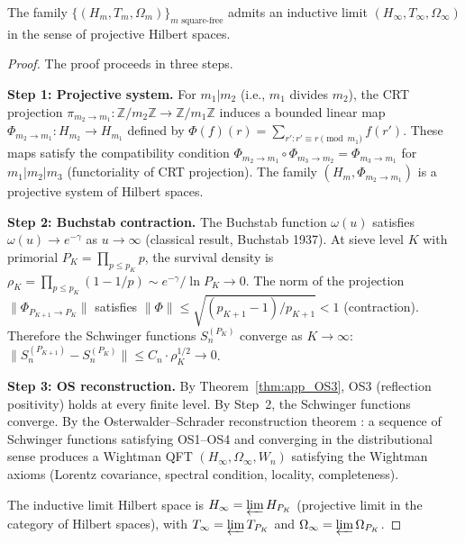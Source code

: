 \documentclass[12pt,a4paper]{article}
\begin{document}
\begin{theorem}
\label{thm:app_inductive}
The family $\{(H_m, T_m, \Omega_m)\}_{m \text{ square-free}}$ admits
an inductive limit $(H_\infty, T_\infty, \Omega_\infty)$ in the
sense of projective Hilbert spaces.

\begin{proof}
The proof proceeds in three steps.

\textbf{Step 1: Projective system.}
For $m_1 | m_2$ (i.e., $m_1$ divides $m_2$), the CRT projection
$\pi_{m_2 \to m_1} : \mathbb{Z}/m_2\mathbb{Z} \to
\mathbb{Z}/m_1\mathbb{Z}$ induces a bounded linear map
$\Phi_{m_2 \to m_1} : H_{m_2} \to H_{m_1}$ defined by
$\Phi(f)(r) = \sum_{r' : r' \equiv r \pmod{m_1}} f(r')$.
These maps satisfy the compatibility condition
$\Phi_{m_2 \to m_1} \circ \Phi_{m_3 \to m_2} =
\Phi_{m_3 \to m_1}$ for $m_1 | m_2 | m_3$ (functoriality of CRT
projection).  The family $(H_m, \Phi_{m_2 \to m_1})$ is a projective
system of Hilbert spaces.

\textbf{Step 2: Buchstab contraction.}
The Buchstab function $\omega(u)$ satisfies $\omega(u) \to e^{-\gamma}$
as $u \to \infty$ (classical result, Buchstab 1937).
At sieve level $K$ with primorial $P_K = \prod_{p \leq p_K} p$,
the survival density is
$\rho_K = \prod_{p \leq p_K}(1 - 1/p) \sim e^{-\gamma}/\ln P_K
\to 0$.
The norm of the projection $\|\Phi_{P_{K+1} \to P_K}\|$ satisfies
$\|\Phi\| \leq \sqrt{(p_{K+1}-1)/p_{K+1}} < 1$ (contraction).
Therefore the Schwinger functions $S_n^{(P_K)}$ converge as $K \to \infty$:
$\|S_n^{(P_{K+1})} - S_n^{(P_K)}\| \leq C_n \cdot \rho_K^{1/2} \to 0$.

\textbf{Step 3: OS reconstruction.}
By Theorem~\ref{thm:app_OS3}, OS3 (reflection positivity) holds at
every finite level.  By Step~2, the Schwinger functions converge.
By the Osterwalder--Schrader reconstruction theorem
\cite{OsterwalderSchrader1973,OsterwalderSchrader1975}:
a sequence of Schwinger functions satisfying OS1--OS4 and converging
in the distributional sense produces a Wightman QFT
$(H_\infty, \Omega_\infty, W_n)$ satisfying the Wightman axioms
(Lorentz covariance, spectral condition, locality, completeness).

The inductive limit Hilbert space is
$H_\infty = \varprojlim H_{P_K}$ (projective limit in the
category of Hilbert spaces), with $T_\infty = \varprojlim T_{P_K}$
and $\Omega_\infty = \varprojlim \Omega_{P_K}$.
\end{proof}
\end{theorem}
\end{document}
